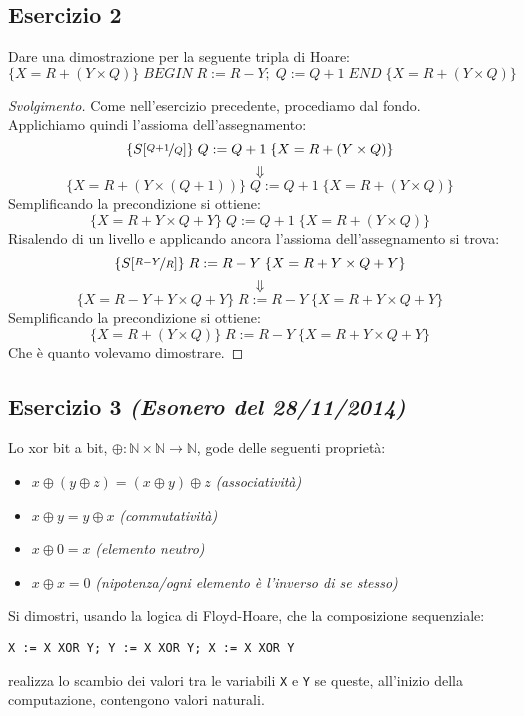 \subsection{Esercizio 2}
Dare una dimostrazione per la seguente tripla di Hoare:
\[ \{X=R+(Y \times Q) \} \; BEGIN \; R:=R-Y; \; Q:=Q+1 \; END \; \{X=R+(Y \times Q)\} \]

\begin{proof}[Svolgimento]
Come nell'esercizio precedente, procediamo dal fondo.\\
Applichiamo quindi l'assioma dell'assegnamento:
\[ \{S[\nicefrac{Q+1}{Q}] \} \; Q:=Q+1 \; \{X=R+(Y \times Q)\} \]
\[ \Downarrow \]
\[ \{X=R+(Y \times (Q+1)) \} \; Q:=Q+1 \; \{X=R+(Y \times Q)\} \]
Semplificando la precondizione si ottiene:
\[ \{X=R+Y \times Q + Y \} \; Q:=Q+1 \; \{X=R+(Y \times Q)\} \]
Risalendo di un livello e applicando ancora l'assioma dell'assegnamento si trova:
\[ \{S[\nicefrac{R-Y}{R}] \} \; R:=R-Y \; \{X=R+Y \times Q + Y \} \]
\[ \Downarrow \]
\[ \{X= R-Y+Y \times Q+Y \} \; R:=R-Y \; \{X=R+Y \times Q + Y \} \]
Semplificando la precondizione si ottiene:
\[ \{X= R+(Y \times Q) \} \; R:=R-Y \; \{X=R+Y \times Q + Y \} \]
Che è quanto volevamo dimostrare.
\end{proof}

\subsection{Esercizio 3 \emph{(Esonero del 28/11/2014)}}
Lo xor bit a bit, $ \oplus: \mathbb{N} \times \mathbb{N} \rightarrow \mathbb{N} $, gode delle
seguenti proprietà:
\begin{itemize}
        \item $ x \oplus (y \oplus z) = (x \oplus y) \oplus z $ \emph{(associatività)}
        \item $ x \oplus y = y \oplus x $ \emph{(commutatività)}
        \item $ x \oplus 0 = x $ \emph{(elemento neutro)}
        \item $ x \oplus x = 0 $ \emph{(nipotenza/ogni elemento è l'inverso di se stesso)}
\end{itemize}
Si dimostri, usando la logica di Floyd-Hoare, che la composizione sequenziale:
\begin{center}
\texttt{X := X XOR Y; Y := X XOR Y; X := X XOR Y}
\end{center}
realizza lo scambio dei valori tra le variabili \texttt{X} e \texttt{Y} se queste, all'inizio della computazione, contengono valori naturali.

